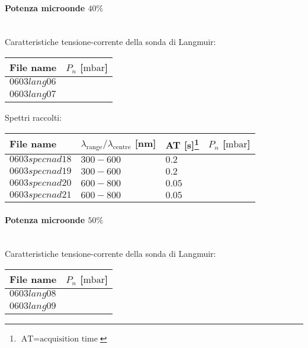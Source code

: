 \paragraph*{Potenza microonde $\text{40\%}$} ~\\
Caratteristiche tensione-corrente della sonda di Langmuir:
\begin{center}
\begin{tabular}{p{3cm}p{3cm}}
\toprule
File name	&$P_n$ [$\si{\milli\bar}$]\\
\midrule
$0603lang06$	&$  $\\
$0603lang07$	&$  $\\
\bottomrule
\end{tabular}
\end{center}

Spettri raccolti:
\begin{center}
\begin{tabular}{p{3cm}p{4cm}p{2cm}p{3cm}}
\toprule
File name	&$\lambda_\text{range}\text{/}\lambda_\text{centre}$ [nm] 	&AT [s]\footnote{$\text{AT}=\text{acquisition time}$} &$P_n$ [$\si{\milli\bar}$]\\
\midrule
$0603specnad18$	&$300-600$	&$0.2$		&$  $\\
$0603specnad19$	&$300-600$	&$0.2$		&$  $\\
$0603specnad20$	&$600-800$	&$0.05$		&$  $\\
$0603specnad21$	&$600-800$	&$0.05$		&$  $\\

\bottomrule
\end{tabular}
\end{center}

\paragraph*{Potenza microonde $\text{50\%}$} ~\\
Caratteristiche tensione-corrente della sonda di Langmuir:
\begin{center}
\begin{tabular}{p{3cm}p{3cm}}
\toprule
File name	&$P_n$ [$\si{\milli\bar}$]\\
\midrule
$0603lang08$	&$  $\\
$0603lang09$	&$  $\\
\bottomrule
\end{tabular}
\end{center}


